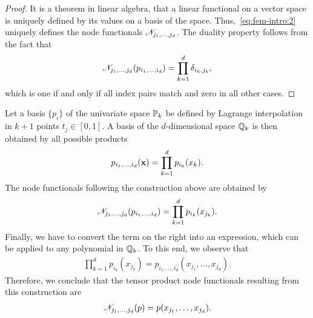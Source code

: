 \begin{proof}
  It is a theorem in linear algebra, that a linear functional on a
  vector space is uniquely defined by its values on a basis of the
  space. Thus,~\eqref{eq:fem-intro:2} uniquely defines the node
  functionals $\nodal_{j_1,\dots,j_d}$. The duality property follows
  from the fact that
  \begin{gather*}
    \nodal_{j_1,\dots,j_d}(p_{i_1,\dots,i_d}) = \prod_{k=1}^d \delta_{i_k,j_k},
  \end{gather*}
  which is one if and only if all index pairs match and zero in all
  other cases.
\end{proof}

\begin{example}
  Let a basis $\{p_i\}$ of the univariate space $\P_k$ be defined by
  Lagrange interpolation in $k+1$ points $t_j \in [0,1]$. A basis of
  the $d$-dimensional space $\Q_k$ is then obtained by all possible
  products
  \begin{gather*}
    p_{i_1,\dots,i_d}(\vx) = \prod_{k=1}^d p_{i_k}(x_k).
  \end{gather*}
  The node functionals following the construction above are obtained by
  \begin{gather*}
    \nodal_{j_1,\dots,j_d}(p_{i_1,\dots,i_d}) = \prod_{k=1}^d p_{i_k}(x_{j_k}).
  \end{gather*}
  Finally, we have to convert the term on the right into an
  expression, which can be applied to any polynomial in $\Q_k$. To
  this end, we observe that
  \begin{gather*}
    \prod_{k=1}^d p_{i_k}(x_{j_k}) = p_{i_1,\dots,i_d}(x_{j_1},\dots,x_{j_d}).
  \end{gather*}
  Therefore, we conclude that the tensor product node functionals
  resulting from this construction are
  \begin{gather*}
    \nodal_{j_1,\dots,j_d}(p) = p(x_{j_1},\dots,x_{j_d}).
  \end{gather*}
\end{example}

